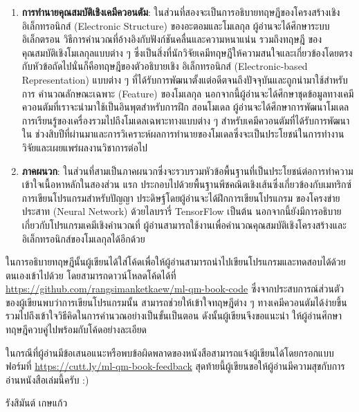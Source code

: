 {\begin{enumerate}[topsep=0pt]
    \item \textbf{การทำนายคุณสมบัติเชิงเคมีควอนตัม}: ในส่วนที่สองจะเป็นการอธิบายทฤษฎีของโครงสร้างเชิงอิเล็กทรอนิกส์ (Electronic 
    Structure) ของอะตอมและโมเลกุล ผู้อ่านจะได้ศึกษาระบบอิเล็กตรอน วิธีการคำนวณที่อ้างอิงกับฟังก์ชันคลื่นและความหนาแน่น รวมถึงทฤษฎี%
    ของคุณสมบัติเชิงโมเลกุลแบบต่าง ๆ ซึ่งเป็นสิ่งที่นักวิจัยเคมีทฤษฎีให้ความสนใจและเกี่ยวข้องโดยตรงกับหัวข้อถัดไปนั่นก็คือทฤษฎีของตัวอธิบายเชิง%
    อิเล็กทรอนิกส์ (Electronic-based Representation) แบบต่าง ๆ ที่ได้รับการพัฒนาตั้งแต่อดีตจนถึงปัจจุบันและถูกนำมาใช้สำหรับการ%
    คำนวณลักษณะเฉพาะ (Feature) ของโมเลกุล นอกจากนี้ผู้อ่านจะได้ศึกษาชุดข้อมูลทางเคมีควอนตัมที่เราจะนำมาใช้เป็นอินพุตสำหรับการฝึก%
    สอนโมเดล ผู้อ่านจะได้ศึกษาการพัฒนาโมเดลการเรียนรู้ของเครื่องรวมไปถึงโมเดลเฉพาะทางแบบต่าง ๆ สำหรับเคมีควอนตัมที่ได้รับการพัฒนาใน%
    ช่วงสิบปีที่ผ่านมาและการวิเคราะห์ผลการทำนายของโมเดลซึ่งจะเป็นประโยชน์ในการทำงานวิจัยและเผยแพร่ผลงานวิชาการต่อไป

    \item \textbf{ภาคผนวก}: ในส่วนที่สามเป็นภาคผนวกซึ่งจะรวบรวมหัวข้อพื้นฐานที่เป็นประโยชน์ต่อการทำความเข้าใจเนื้อหาหลักในสองส่วน%
    แรก ประกอบไปด้วยพื้นฐานพีชคณิตเชิงเส้นซึ่งเกี่ยวข้องกับเมทริกซ์ การเขียนโปรแกรมสำหรับปัญญา ประดิษฐ์โดยผู้อ่านจะได้ฝึกการเขียนโปรแกรม%
    ของโครงข่ายประสาท (Neural Network) ด้วยไลบรารี่ TensorFlow เป็นต้น นอกจากนี้ยังมีการอธิบายเกี่ยวกับโปรแกรมเคมีเชิงคำนวณที่%
    ผู้อ่านสามารถใช้งานเพื่อคำนวณคุณสมบัติเชิงโครงสร้างและอิเล็กทรอนิกส์ของโมเลกุลได้อีกด้วย
\end{enumerate}

ในการอธิบายทฤษฎีนั้นผู้เขียนได้ใส่โค้ดเพื่อให้ผู้อ่านสามารถนำไปเขียนโปรแกรมและทดสอบได้ด้วยตนเองเข้าไปด้วย โดยสามารถดาวน์โหลดโค้ดได้ที่ 
\url{https://github.com/rangsimanketkaew/ml-qm-book-code} ซึ่งจากประสบการณ์ส่วนตัวของผู้เขียนพบว่าการเขียนโปรแกรมนั้น%
สามารถช่วยให้เข้าใจทฤษฎีต่าง ๆ ทางเคมีควอนตัมได้ง่ายขึ้น รวมไปถึงเข้าใจวิธีคิดในการคำนวณอย่างเป็นขั้นเป็นตอน ดังนั้นผู้เขียนจึงขอแนะนำ%
ให้ผู้อ่านศึกษาทฤษฎีควบคู่ไปพร้อมกับโค้ดอย่างละเอียด

ในกรณีที่ผู้อ่านมีข้อเสนอแนะหรือพบข้อผิดพลาดของหนังสือสามารถแจ้งผู้เขียนได้โดยกรอกแบบฟอร์มที่ 
\url{https://cutt.ly/ml-qm-book-feedback} สุดท้ายนี้ผู้เขียนขอให้ผู้อ่านมีความสุขกับการอ่านหนังสือเล่มนี้ครับ :)

\medskip

\begin{flushright}
รังสิมันต์ เกษแก้ว
\end{flushright}
}
